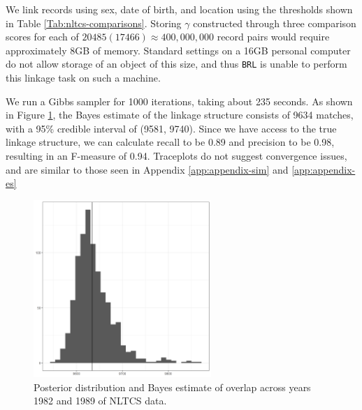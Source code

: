 \documentclass[ba]{imsart}
\begin{document}
	We link records using sex, date of birth, and location using the thresholds shown in Table \ref{Tab:nltcs-comparisons}. Storing $\gamma$ constructed through three comparison scores for each of $20485 (17466) \approx 400,000,000$ record pairs would require approximately 8GB of memory. Standard settings on a 16GB personal computer do not allow storage of an object of this size, and thus \texttt{BRL} is unable to perform this linkage task on such a machine. {}
	
	We run a Gibbs sampler for 1000 iterations, taking about 235 seconds. As shown in Figure \ref{fig:nltcs-overlap-plot}, the Bayes estimate of the linkage structure consists of 9634 matches, with a 95\% credible interval of (9581, 9740). Since we have access to the true linkage structure, we can calculate recall to be 0.89 and precision to be 0.98, resulting in an F-measure of 0.94. Traceplots do not suggest convergence issues, and are similar to those seen in Appendix \ref{app:appendix-sim} and \ref{app:appendix-es}
	
	\begin{figure}[h]
		\begin{center}
		        \includegraphics[width=0.6\textwidth]{finalFigures/nltcs/overlap_posterior4}
			\caption{Posterior distribution and Bayes estimate of overlap across years 1982 and 1989 of NLTCS data.}
			\label{fig:nltcs-overlap-plot}
		\end{center}
	\end{figure}
	
\end{document}
